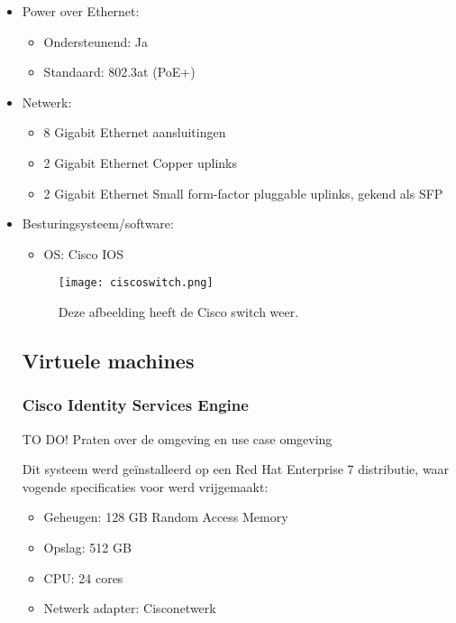 \begin{itemize}
	\item Power over Ethernet:
	\begin{itemize}
		\item Ondersteunend: Ja
		\item Standaard: 802.3at (PoE+)
	\end{itemize}
	\item Netwerk:
	\begin{itemize}
		\item 8 Gigabit Ethernet aansluitingen
		\item 2 Gigabit Ethernet Copper uplinks
		\item 2 Gigabit Ethernet Small form-factor pluggable uplinks, gekend als SFP
	\end{itemize}
	\item Besturingsysteem/software:
	\begin{itemize}
		\item OS: Cisco IOS
\end{itemize}

\begin{figure}[H]
	\centering
	\texttt{[image: ciscoswitch.png]}
	\caption{Deze afbeelding heeft de Cisco switch weer. }
\end{figure}

\subsection{Virtuele machines}
\subsubsection{Cisco Identity Services Engine}
 TO DO! Praten over de omgeving en use case omgeving 
\newline
\newline

Dit systeem werd geïnstalleerd op een Red Hat Enterprise 7 distributie, waar vogende specificaties voor werd vrijgemaakt: 

\begin{itemize}
	\item Geheugen: 128 GB Random Access Memory
	\item Opslag: 512 GB
	\item CPU: 24 cores
	\item Netwerk adapter: Cisco\textunderscore netwerk
\end{itemize}


\end{itemize}
